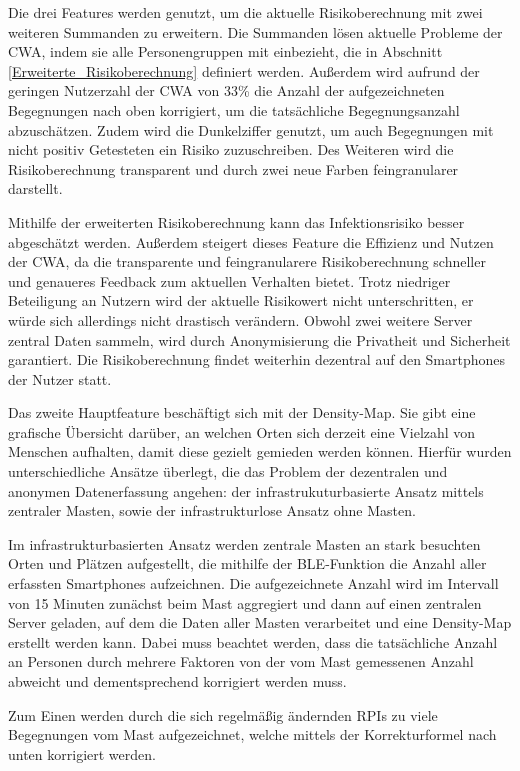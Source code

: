 \documentclass[conference,compsoc]{IEEEtran}
\begin{document}
Die drei Features werden genutzt, um die aktuelle Risikoberechnung mit zwei weiteren Summanden zu erweitern.
Die Summanden lösen aktuelle Probleme der CWA, indem sie alle Personengruppen mit einbezieht, die in Abschnitt \ref{Erweiterte_Risikoberechnung} definiert werden.
Außerdem wird aufrund der geringen Nutzerzahl der CWA von 33\% die Anzahl der aufgezeichneten Begegnungen nach oben korrigiert, um die tatsächliche Begegnungsanzahl abzuschätzen. 
Zudem wird die Dunkelziffer genutzt, um auch Begegnungen mit nicht positiv Getesteten ein Risiko zuzuschreiben.
Des Weiteren wird die Risikoberechnung transparent und durch zwei neue Farben feingranularer darstellt.

Mithilfe der erweiterten Risikoberechnung kann das Infektionsrisiko besser abgeschätzt werden.
Außerdem steigert dieses Feature die Effizienz und Nutzen der CWA, da die transparente und feingranularere Risikoberechnung schneller und genaueres Feedback zum aktuellen Verhalten bietet. 
Trotz niedriger Beteiligung an Nutzern wird der aktuelle Risikowert nicht unterschritten, er würde sich allerdings nicht drastisch verändern.
Obwohl zwei weitere Server zentral Daten sammeln, wird durch Anonymisierung die Privatheit und Sicherheit garantiert.
Die Risikoberechnung findet weiterhin dezentral auf den Smartphones der Nutzer statt. 

Das zweite Hauptfeature beschäftigt sich mit der Density-Map. 
Sie gibt eine grafische Übersicht darüber, an welchen Orten sich derzeit eine Vielzahl von Menschen aufhalten, damit diese gezielt gemieden werden können. 
Hierfür wurden unterschiedliche Ansätze überlegt, die das Problem der dezentralen und anonymen Datenerfassung angehen: 
der infrastrukuturbasierte Ansatz mittels zentraler Masten, sowie der infrastrukturlose Ansatz ohne Masten. 

Im infrastrukturbasierten Ansatz werden zentrale Masten an stark besuchten Orten und Plätzen aufgestellt, die mithilfe der BLE-Funktion die Anzahl aller erfassten Smartphones aufzeichnen.
Die aufgezeichnete Anzahl wird im Intervall von 15 Minuten zunächst beim Mast aggregiert und dann auf einen zentralen Server geladen, auf dem die Daten aller Masten verarbeitet und eine Density-Map erstellt werden kann.
Dabei muss beachtet werden, dass die tatsächliche Anzahl an Personen durch mehrere Faktoren von der vom Mast gemessenen Anzahl abweicht und dementsprechend korrigiert werden muss.

Zum Einen werden durch die sich regelmäßig ändernden RPIs zu viele Begegnungen vom Mast aufgezeichnet, welche mittels der Korrekturformel nach unten korrigiert werden.
\end{document}
